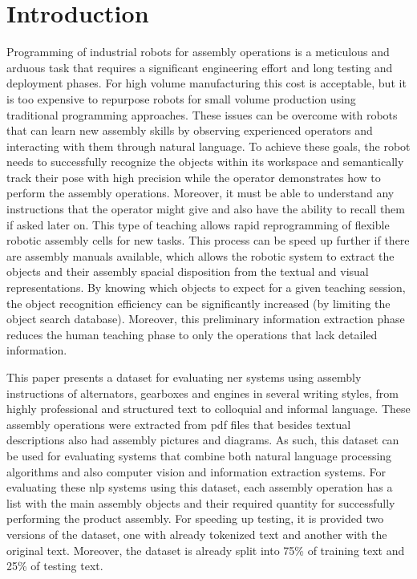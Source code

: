 \section{Introduction}\label{sec:introduction}

Programming of industrial robots for assembly operations is a meticulous and arduous task that requires a significant engineering effort and long testing and deployment phases. For high volume manufacturing this cost is acceptable, but it is too expensive to repurpose robots for small volume production using traditional programming approaches. These issues can be overcome with robots that can learn new assembly skills by observing experienced operators and interacting with them through natural language. To achieve these goals, the robot needs to successfully recognize the objects within its workspace and semantically track their pose with high precision while the operator demonstrates how to perform the assembly operations. Moreover, it must be able to understand any instructions that the operator might give and also have the ability to recall them if asked later on. This type of teaching allows rapid reprogramming of flexible robotic assembly cells for new tasks. This process can be speed up further if there are assembly manuals available, which allows the robotic system to extract the objects and their assembly spacial disposition from the textual and visual representations. By knowing which objects to expect for a given teaching session, the object recognition efficiency can be significantly increased (by limiting the object search database). Moreover, this preliminary information extraction phase reduces the human teaching phase to only the operations that lack detailed information.

This paper presents a dataset for evaluating \gls{ner} systems using assembly instructions of alternators, gearboxes and engines in several writing styles, from highly professional and structured text to colloquial and informal language. These assembly operations were extracted from \gls{pdf} files that besides textual descriptions also had assembly pictures and diagrams. As such, this dataset can be used for evaluating systems that combine both natural language processing algorithms and also computer vision and information extraction systems. For evaluating these \gls{nlp} systems using this dataset, each assembly operation has a list with the main assembly objects and their required quantity for successfully performing the product assembly. For speeding up testing, it is provided two versions of the dataset, one with already tokenized text and another with the original text. Moreover, the dataset is already split into 75\% of training text and 25\% of testing text.


